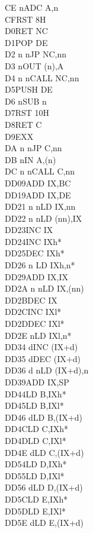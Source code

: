 \documentclass[oneside,a4paper]{book}
\begin{document}
\begin{multicols}{3}
{\begin{tabbing}
CE n\>ADC A,n\\
CF\>RST 8H\\
D0\>RET NC\\
D1\>POP DE\\
D2 n n\>JP NC,nn\\
D3 n\>OUT (n),A\\
D4 n n\>CALL NC,nn\\
D5\>PUSH DE\\
D6 n\>SUB n\\
D7\>RST 10H\\
D8\>RET C\\
D9\>EXX\\
DA n n\>JP C,nn\\
DB n\>IN A,(n)\\
DC n n\>CALL C,nn\\
DD09\>ADD IX,BC\\
DD19\>ADD IX,DE\\
DD21 n n\>LD IX,nn\\
DD22 n n\>LD (nn),IX\\
DD23\>INC IX\\
DD24\>INC IXh*\\
DD25\>DEC IXh*\\
DD26 n \>LD IXh,n*\\
DD29\>ADD IX,IX\\
DD2A n n\>LD IX,(nn)\\
DD2B\>DEC IX\\
DD2C\>INC IXl*\\
DD2D\>DEC IXl*\\
DD2E n\>LD IXl,n*\\
DD34 d\>INC (IX+d)\\
DD35 d\>DEC (IX+d)\\
DD36 d n\>LD (IX+d),n\\
DD39\>ADD IX,SP\\
DD44\>LD B,IXh*\\
DD45\>LD B,IXl*\\
DD46 d\>LD B,(IX+d)\\
DD4C\>LD C,IXh*\\
DD4D\>LD C,IXl*\\
DD4E d\>LD C,(IX+d)\\
DD54\>LD D,IXh*\\
DD55\>LD D,IXl*\\
DD56 d\>LD D,(IX+d)\\
DD5C\>LD E,IXh*\\
DD5D\>LD E,IXl*\\
DD5E d\>LD E,(IX+d)\\

\end{tabbing}}
\end{multicols}
\end{document}
